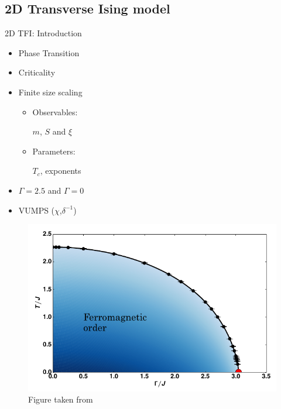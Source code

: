 \subsection{2D Transverse Ising model}

\begin{frame}{2D TFI: Introduction}
    \begin{minipage}{0.35\textwidth}
        \begin{itemize}
            \item Phase Transition
            \item Criticality
            \item Finite size scaling
                  \begin{itemize}
                      \item Observables:

                            $m$, $S$ and $\xi$
                      \item Parameters:

                            $T_c$, exponents
                  \end{itemize}
            \item $\Gamma=2.5$ and $\Gamma=0$
            \item VUMPS ($\chi$,$\delta^{-1}$)
        \end{itemize}
    \end{minipage}
    \begin{minipage}{0.64\textwidth}
        \begin{figure}
            \centering
            \includegraphics[width=\linewidth]{../Figuren/phsyics/2disingphase.png}
            \caption*{Figure taken from \cite{Hesselmann2016}  }
        \end{figure}
    \end{minipage}
\end{frame}

